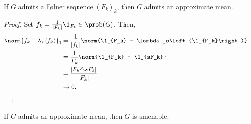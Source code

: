 \begin{proposition}
  If $G$ admits a Følner sequence $\left(F_k\right)_k$, then $G$ admits an approximate mean.
\end{proposition}
\begin{proof}
  Set $f_k = \frac{1}{\left\vert F_k \right\vert}\1_{F_k}\in \prob(G)$. Then,
  \begin{align*}
    \norm{f_k - \lambda_s\left(f_k\right)}_{1} &= \frac{1}{\left\vert f_k \right\vert} \norm{\1_{F_k} - \lambda_s\left(\1_{F_k}\right)}\\
                                               &= \frac{1}{F_k}\norm{\1_{F_k} - \1_{sF_k}}\\
                                               &= \frac{\left\vert F_k\triangle sF_k \right\vert}{\left\vert F_k \right\vert}\\
                                               &\rightarrow 0.
  \end{align*}
\end{proof}
\begin{proposition}
  If $G$ admits an approximate mean, then $G$ is amenable.
\end{proposition}
